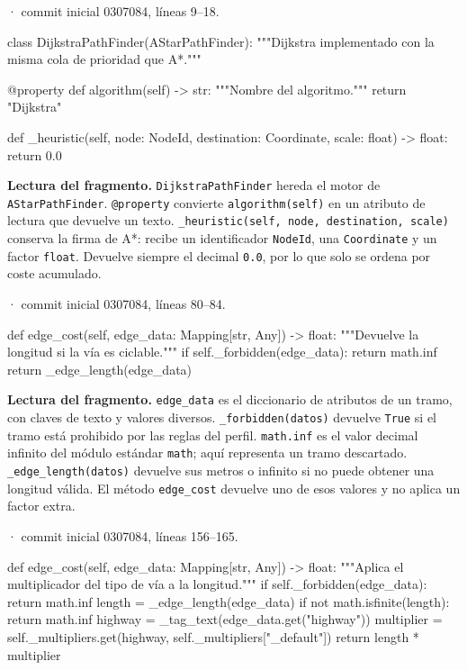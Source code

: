 \documentclass[11pt,a4paper]{article}
\begin{document}
\smallskip
{\footnotesize\texttt{} · commit inicial 0307084, líneas 9--18.}\par
\begin{Codigo}[firstnumber=9]
class DijkstraPathFinder(AStarPathFinder):
    """Dijkstra implementado con la misma cola de prioridad que A*."""

    @property
    def algorithm(self) -> str:
        """Nombre del algoritmo."""
        return "Dijkstra"

    def _heuristic(self, node: NodeId, destination: Coordinate, scale: float) -> float:
        return 0.0
\end{Codigo}

\textbf{Lectura del fragmento.} \texttt{DijkstraPathFinder} hereda el motor de \texttt{AStarPathFinder}. \texttt{@property} convierte \texttt{algorithm(self)} en un atributo de lectura que devuelve un texto. \texttt{\_heuristic(self, node, destination, scale)} conserva la firma de A*: recibe un identificador \texttt{NodeId}, una \texttt{Coordinate} y un factor \texttt{float}. Devuelve siempre el decimal \texttt{0.0}, por lo que solo se ordena por coste acumulado.


\smallskip
{\footnotesize\texttt{} · commit inicial 0307084, líneas 80--84.}\par
\begin{Codigo}[firstnumber=80]
    def edge_cost(self, edge_data: Mapping[str, Any]) -> float:
        """Devuelve la longitud si la vía es ciclable."""
        if self._forbidden(edge_data):
            return math.inf
        return _edge_length(edge_data)
\end{Codigo}

\textbf{Lectura del fragmento.} \texttt{edge\_data} es el diccionario de atributos de un tramo, con claves de texto y valores diversos. \texttt{\_forbidden(datos)} devuelve \texttt{True} si el tramo está prohibido por las reglas del perfil. \texttt{math.inf} es el valor decimal infinito del módulo estándar \texttt{math}; aquí representa un tramo descartado. \texttt{\_edge\_length(datos)} devuelve sus metros o infinito si no puede obtener una longitud válida. El método \texttt{edge\_cost} devuelve uno de esos valores y no aplica un factor extra.


\smallskip
{\footnotesize\texttt{} · commit inicial 0307084, líneas 156--165.}\par
\begin{Codigo}[firstnumber=156]
    def edge_cost(self, edge_data: Mapping[str, Any]) -> float:
        """Aplica el multiplicador del tipo de vía a la longitud."""
        if self._forbidden(edge_data):
            return math.inf
        length = _edge_length(edge_data)
        if not math.isfinite(length):
            return math.inf
        highway = _tag_text(edge_data.get("highway"))
        multiplier = self._multipliers.get(highway, self._multipliers["_default"])
        return length * multiplier
\end{Codigo}
\end{document}
